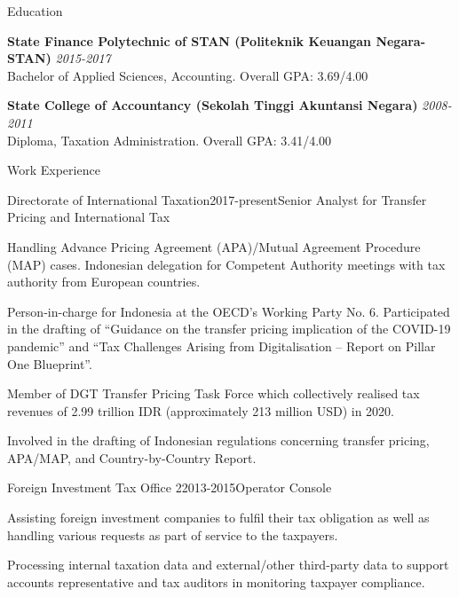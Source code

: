 \documentclass{resume}
\begin{document}
\begin{rSection}{Education}


{\bf State Finance Polytechnic of STAN (Politeknik Keuangan Negara-STAN)} \hfill {\em 2015-2017} 
\\ Bachelor of Applied Sciences, Accounting.\hfill { Overall GPA: 3.69/4.00 }

{\bf State College of Accountancy (Sekolah Tinggi Akuntansi Negara)} \hfill {\em 2008-2011} 
\\ Diploma, Taxation Administration.\hfill { Overall GPA: 3.41/4.00 }

\end{rSection}

\begin{rSection}{Work Experience}
\begin{rSubsection}{Directorate of International Taxation}{2017-present}{Senior Analyst for Transfer Pricing and International Tax}{}
 \item Handling Advance Pricing Agreement (APA)/Mutual Agreement Procedure (MAP) cases. Indonesian delegation for Competent Authority meetings with tax authority from European countries.
 \item Person-in-charge for Indonesia at the OECD's Working Party No. 6. Participated in the drafting of “Guidance on the transfer pricing implication of the COVID-19 pandemic” and “Tax Challenges Arising from Digitalisation – Report on Pillar One Blueprint”.
 \item Member of DGT Transfer Pricing Task Force which collectively realised tax revenues of 2.99 trillion IDR (approximately 213 million USD) in 2020.
 \item Involved in the drafting of Indonesian regulations concerning transfer pricing, APA/MAP, and Country-by-Country Report.
\end{rSubsection}
\begin{rSubsection}{Foreign Investment Tax Office 2}{2013-2015}{Operator Console}{}
 \item Assisting foreign investment companies to fulfil their tax obligation as well as handling various requests as part of service to the taxpayers.
 \item Processing internal taxation data and external/other third-party data to support accounts representative and tax auditors in monitoring taxpayer compliance.
\end{rSubsection}
\end{rSection}
\end{document}
